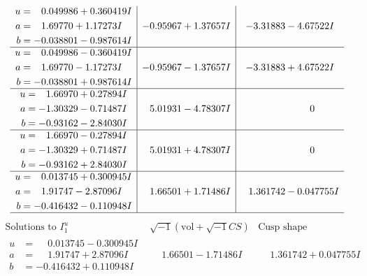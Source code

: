 \documentclass[1p]{elsarticle_modified}
\theoremstyle{definition}
\newcommand{\I}{\sqrt{-1}}
\begin{document}
$$\begin{array}{c|c|c}
\begin{aligned}
u &= \phantom{-}0.049986 + 0.360419 I \\
a &= \phantom{-}1.69770 + 1.17273 I \\
b &= -0.038801 - 0.987614 I\end{aligned}
 & -0.95967 + 1.37657 I & -3.31883 - 4.67522 I \\ \hline\begin{aligned}
u &= \phantom{-}0.049986 - 0.360419 I \\
a &= \phantom{-}1.69770 - 1.17273 I \\
b &= -0.038801 + 0.987614 I\end{aligned}
 & -0.95967 - 1.37657 I & -3.31883 + 4.67522 I \\ \hline\begin{aligned}
u &= \phantom{-}1.66970 + 0.27894 I \\
a &= -1.30329 - 0.71487 I \\
b &= -0.93162 - 2.84030 I\end{aligned}
 & \phantom{-}5.01931 - 4.78307 I & \phantom{-0.000000 } 0 \\ \hline\begin{aligned}
u &= \phantom{-}1.66970 - 0.27894 I \\
a &= -1.30329 + 0.71487 I \\
b &= -0.93162 + 2.84030 I\end{aligned}
 & \phantom{-}5.01931 + 4.78307 I & \phantom{-0.000000 } 0 \\ \hline\begin{aligned}
u &= \phantom{-}0.013745 + 0.300945 I \\
a &= \phantom{-}1.91747 - 2.87096 I \\
b &= -0.416432 - 0.110948 I\end{aligned}
 & \phantom{-}1.66501 + 1.71486 I & \phantom{-}1.361742 - 0.047755 I\\
 \hline 
 \end{array}$$\newpage$$\begin{array}{c|c|c}  
\text{Solutions to }I^u_{1}& \I (\text{vol} + \sqrt{-1}CS) & \text{Cusp shape}\\
 \hline 
\begin{aligned}
u &= \phantom{-}0.013745 - 0.300945 I \\
a &= \phantom{-}1.91747 + 2.87096 I \\
b &= -0.416432 + 0.110948 I\end{aligned}
 & \phantom{-}1.66501 - 1.71486 I & \phantom{-}1.361742 + 0.047755 I \\ \hline\begin{aligned}

\end{aligned}
\end{array}$$
\end{document}
